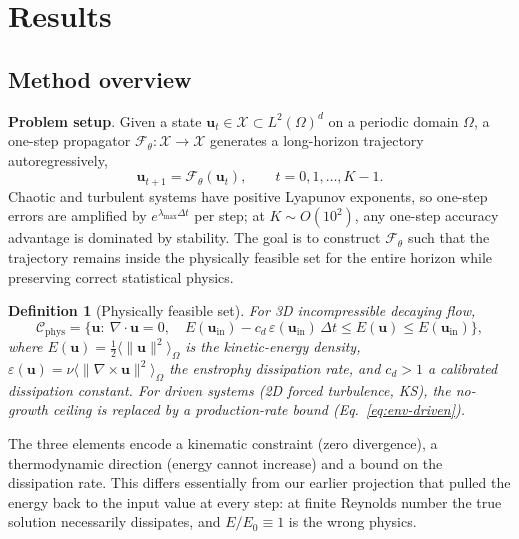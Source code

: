 \documentclass[11pt,a4paper]{article}
\newtheorem{definition}{Definition}
\newcommand{\bu}{\bm{u}}
\newcommand{\cF}{\mathcal{F}}
\newcommand{\cC}{\mathcal{C}}
\newcommand{\cX}{\mathcal{X}}
\newcommand{\Ex}{E}
\begin{document}
\section{Results}

\subsection{Method overview}\label{sec:arch}

\textbf{Problem setup}. Given a state $\bu_t\in\cX\subset L^2(\Omega)^d$ on a periodic domain $\Omega$, a one-step propagator $\cF_\theta:\cX\to\cX$ generates a long-horizon trajectory autoregressively,
\begin{equation}
\bu_{t+1}=\cF_\theta(\bu_t),\qquad t=0,1,\dots,K-1 .
\label{eq:rollout}
\end{equation}
Chaotic and turbulent systems have positive Lyapunov exponents, so one-step errors are amplified by $e^{\lambda_{\max}\Delta t}$ per step; at $K\sim O(10^2)$, any one-step accuracy advantage is dominated by stability. The goal is to construct $\cF_\theta$ such that the trajectory remains inside the physically feasible set for the entire horizon while preserving correct statistical physics.

\begin{definition}[Physically feasible set]
For 3D incompressible decaying flow,
\begin{equation}
\cC_{\mathrm{phys}}=\Big\{\bu:\ \nabla\!\cdot\!\bu=0,\quad \Ex(\bu_{\mathrm{in}})-c_d\,\varepsilon(\bu_{\mathrm{in}})\,\Delta t\le \Ex(\bu)\le \Ex(\bu_{\mathrm{in}})\Big\},
\label{eq:feasible}
\end{equation}
where $\Ex(\bu)=\tfrac12\langle\|\bu\|^2\rangle_\Omega$ is the kinetic-energy density, $\varepsilon(\bu)=\nu\langle\|\nabla\times\bu\|^2\rangle_\Omega$ the enstrophy dissipation rate, and $c_d>1$ a calibrated dissipation constant. For driven systems (2D forced turbulence, KS), the no-growth ceiling is replaced by a production-rate bound (Eq.~\eqref{eq:env-driven}).
\end{definition}

The three elements encode a kinematic constraint (zero divergence), a thermodynamic direction (energy cannot increase) and a bound on the dissipation rate. This differs essentially from our earlier projection that pulled the energy back to the input value at every step: at finite Reynolds number the true solution necessarily dissipates, and $\Ex/\Ex_0\equiv1$ is the wrong physics.
\end{document}
